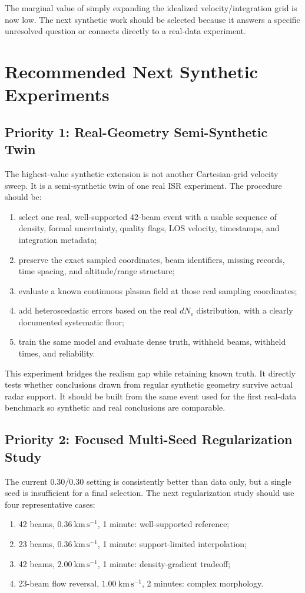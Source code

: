 \documentclass[11pt]{article}
\newcommand{\Ne}{N_{\mathrm e}}
\newcommand{\kmps}{\mathrm{km\,s^{-1}}}
\begin{document}
The marginal value of simply expanding the idealized velocity/integration grid is now low. The next synthetic
work should be selected because it answers a specific unresolved question or connects directly to a real-data
experiment.

\section{Recommended Next Synthetic Experiments}

\subsection{Priority 1: Real-Geometry Semi-Synthetic Twin}

The highest-value synthetic extension is not another Cartesian-grid velocity sweep. It is a semi-synthetic
twin of one real ISR experiment. The procedure should be:
\begin{enumerate}
  \item select one real, well-supported 42-beam event with a usable sequence of density, formal uncertainty,
  quality flags, LOS velocity, timestamps, and integration metadata;
  \item preserve the exact sampled coordinates, beam identifiers, missing records, time spacing, and
  altitude/range structure;
  \item evaluate a known continuous plasma field at those real sampling coordinates;
  \item add heteroscedastic errors based on the real $d\Ne$ distribution, with a clearly documented
  systematic floor;
  \item train the same model and evaluate dense truth, withheld beams, withheld times, and reliability.
\end{enumerate}

This experiment bridges the realism gap while retaining known truth. It directly tests whether conclusions
drawn from regular synthetic geometry survive actual radar support. It should be built from the same event
used for the first real-data benchmark so synthetic and real conclusions are comparable.

\subsection{Priority 2: Focused Multi-Seed Regularization Study}

The current 0.30/0.30 setting is consistently better than data only, but a single seed is insufficient for a
final selection. The next regularization study should use four representative cases:
\begin{enumerate}
  \item 42 beams, $0.36~\kmps$, 1 minute: well-supported reference;
  \item 23 beams, $0.36~\kmps$, 1 minute: support-limited interpolation;
  \item 42 beams, $2.00~\kmps$, 1 minute: density-gradient tradeoff;
  \item 23-beam flow reversal, $1.00~\kmps$, 2 minutes: complex morphology.
\end{enumerate}
\end{document}
